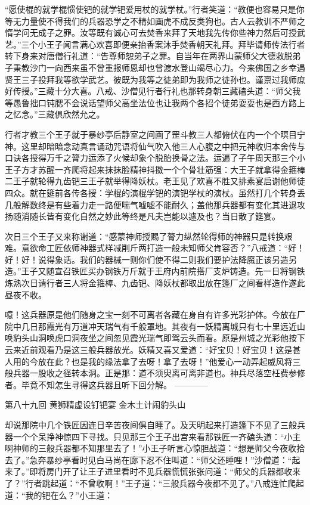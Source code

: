 \documentclass[12pt,UTF8]{ctexbook}
\begin{document}
{	“愿使棍的就学棍惯使钯的就学钯爱用杖的就学杖。”行者笑道：“教便也容易只是你等无力量使不得我们的兵器恐学之不精如画虎不成反类狗也。古人云教训不严师之惰学问无成子之罪。汝等既有诚心可去焚香来拜了天地我先传你些神力然后可授武艺。”三个小王子闻言满心欢喜即便亲抬香案沐手焚香朝天礼拜。拜毕请师传法行者转下身来对唐僧行礼道：“告尊师恕弟子之罪。自当年在两界山蒙师父大德救脱弟子秉教沙门一向西来虽不曾重报师恩却也曾渡水登山竭尽心力。今来佛国之乡幸遇贤王三子投拜我等欲学武艺。彼既为我等之徒弟即为我师之徒孙也。谨禀过我师庶好传授。”三藏十分大喜。八戒、沙僧见行者行礼也那转身朝三藏磕头道：“师父我等愚鲁拙口钝腮不会说话望师父高坐法位也让我两个各招个徒弟耍耍也是西方路上之忆念。”三藏俱欣然允之。
	
	行者才教三个王子就于暴纱亭后静室之间画了罡斗教三人都俯伏在内一个个瞑目宁神。这里却暗暗念动真言诵动咒语将仙气吹入他三人心腹之中把元神收归本舍传与口诀各授得万千之膂力运添了火候却象个脱胎换骨之法。运遍了子午周天那三个小王子方才苏醒一齐爬将起来抹抹脸精神抖擞一个个骨壮筋强：大王子就拿得金箍棒二王子就轮得九齿钯三王子就举得降妖杖。老王见了欢喜不胜又排素宴启谢他师徒四众。就在筵前各传各授：学棍的演棍学钯的演钯学杖的演杖。虽然打几个转身丢几般解数终是有些着力走一路便喘气嘘嘘不能耐久；盖他那兵器都有变化其进退攻扬随消随长皆有变化自然之妙此等终是凡夫岂能以遽及也？当日散了筵宴。
	
	次日三个王子又来称谢道：“感蒙神师授赐了膂力纵然轮得师的神器只是转换艰难。意欲命工匠依师神器式样减削斤两打造一般未知师父肯容否？”八戒道：“好！好！好！说得象话。我们的器械一则你们使不得二则我们要护法降魔正该另造另造。”王子又随宣召铁匠买办钢铁万斤就于王府内前院搭厂支炉铸造。先一日将钢铁炼熟次日请行者三人将金箍棒、九齿钯、降妖杖都取出放在篷厂之间看样造作遂此昼夜不收。
	
	噫！这兵器原是他们随身之宝一刻不可离者各藏在身自有许多光彩护体。今放在厂院中几日那霞光有万道冲天瑞气有千般罩地。其夜有一妖精离城只有七十里远近山唤豹头山洞唤虎口洞夜坐之间忽见霞光瑞气即驾云头而看。原是州城之光彩他按下云来近前观看乃是这三般兵器放光。妖精又喜又爱道：“好宝贝！好宝贝！这是甚人用的今放在此？也是我的缘法拿了去呀！拿了去呀！”他爱心一动弄起威风将三般兵器一股收之径转本洞。正是那：道不须臾离可离非道也。神兵尽落空枉费参修者。毕竟不知怎生寻得这兵器且听下回分解。
	------------
	
	第八十九回 黄狮精虚设钉钯宴 金木土计闹豹头山
	
	却说那院中几个铁匠因连日辛苦夜间俱自睡了。及天明起来打造篷下不见了三般兵器一个个呆挣神惊四下寻找。只见那三个王子出宫来看那铁匠一齐磕头道：“小主啊神师的三般兵器都不知那里去了！”小王子听言心惊胆战道：“想是师父今夜收拾去了。”急奔暴纱亭看时见白马尚在廊下忍不住叫道：“师父还睡哩！”沙僧道：“起来了。”即将房门开了让王子进里看时不见兵器慌慌张张问道：“师父的兵器都收来了？”行者跳起道：“不曾收啊！”王子道：“三般兵器今夜都不见了。”八戒连忙爬起道：“我的钯在么？”小王道：
	
}
\end{document}
